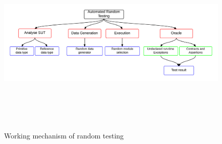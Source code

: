 \begin{figure}[h]
	\centering
	\centerline{\includegraphics[width=16.5cm, height=9cm ]{chapter2/randomTestingMechanism.png}}
	\caption{Working mechanism of random testing}
\end{figure}

